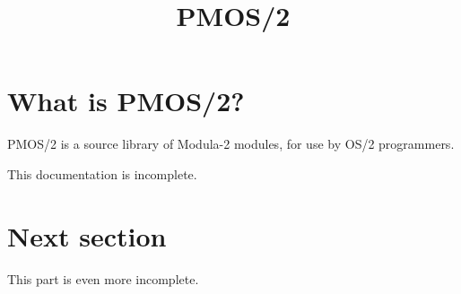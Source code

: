 





\title{PMOS/2}

\chapter{What is PMOS/2?}

PMOS/2 is a source library of Modula-2 modules, for use by OS/2 programmers.

This documentation is incomplete.

\chapter{Next section}

This part is even more incomplete.


